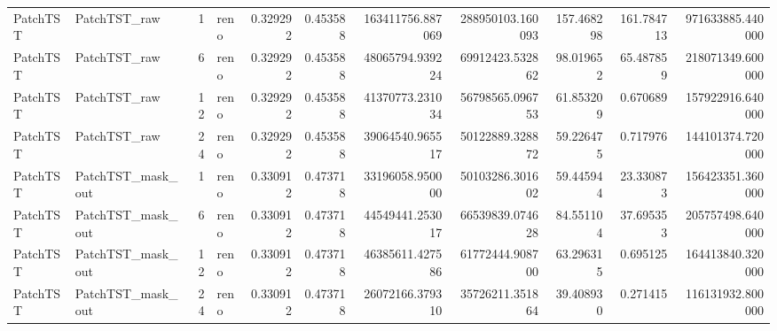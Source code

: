 \begin{longtable}{llrlrrrrrrr}
PatchTST & PatchTST\_raw & 1 & reno & 0.329292 & 0.453588 & 163411756.887069 & 288950103.160093 & 157.468298 & 161.784713 & 971633885.440000 \\
PatchTST & PatchTST\_raw & 6 & reno & 0.329292 & 0.453588 & 48065794.939224 & 69912423.532862 & 98.019652 & 65.487859 & 218071349.600000 \\
PatchTST & PatchTST\_raw & 12 & reno & 0.329292 & 0.453588 & 41370773.231034 & 56798565.096753 & 61.853209 & 0.670689 & 157922916.640000 \\
PatchTST & PatchTST\_raw & 24 & reno & 0.329292 & 0.453588 & 39064540.965517 & 50122889.328872 & 59.226475 & 0.717976 & 144101374.720000 \\
PatchTST & PatchTST\_mask\_out & 1 & reno & 0.330912 & 0.473718 & 33196058.950000 & 50103286.301602 & 59.445944 & 23.330873 & 156423351.360000 \\
PatchTST & PatchTST\_mask\_out & 6 & reno & 0.330912 & 0.473718 & 44549441.253017 & 66539839.074628 & 84.551104 & 37.695353 & 205757498.640000 \\
PatchTST & PatchTST\_mask\_out & 12 & reno & 0.330912 & 0.473718 & 46385611.427586 & 61772444.908700 & 63.296315 & 0.695125 & 164413840.320000 \\
PatchTST & PatchTST\_mask\_out & 24 & reno & 0.330912 & 0.473718 & 26072166.379310 & 35726211.351864 & 39.408930 & 0.271415 & 116131932.800000 \\
\end{longtable}
